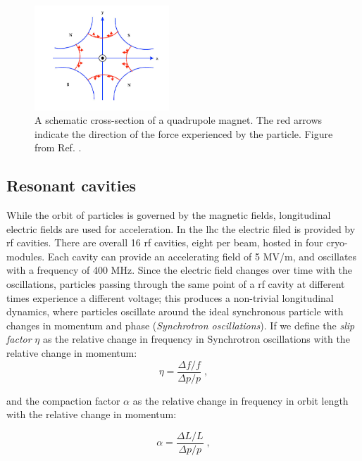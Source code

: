 \begin{figure}[ht]
\centering
\includegraphics[width=0.45\textwidth]{figures/lhc/figures_quad}
\caption{A schematic cross-section of a quadrupole magnet. The red arrows indicate the direction of the force experienced by the particle. Figure from Ref. \cite{Kain:2016aly}.}
\label{fig:lhc:quad}
\end{figure}

\subsection{Resonant cavities}

While the orbit of particles is governed by the magnetic fields, longitudinal electric fields are used for acceleration. In the \gls{lhc} the electric filed is provided by \gls{rf} cavities. There are overall 16 \gls{rf} cavities, eight per beam, hosted in four cryo-modules. Each cavity can provide an accelerating field of 5 MV/m, and oscillates with a frequency of 400 MHz. Since the electric field changes over time with the oscillations, particles passing through the same point of a \gls{rf} cavity at different times experience a different voltage; this produces a non-trivial longitudinal dynamics, where particles oscillate around the ideal synchronous particle with changes in momentum and phase (\textit{Synchrotron oscillations}). If we define the \textit{slip factor} $\eta$ as the relative change in frequency in Synchrotron oscillations with the relative change in momentum:
\begin{equation}
\eta = \frac{\Delta f / f}{\Delta p / p} \; ,
\end{equation}

\noindent and the compaction factor $\alpha$ as the relative change in frequency in orbit length with the relative change in momentum:

\begin{equation}
\alpha = \frac{\Delta L / L}{\Delta p / p} \; ,
\end{equation}

